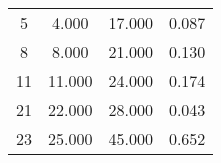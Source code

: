 % 
\begin{tabular}{cccc}
  \hline
  \hline
5 & 4.000 & 17.000 & 0.087 \\ 
  8 & 8.000 & 21.000 & 0.130 \\ 
  11 & 11.000 & 24.000 & 0.174 \\ 
  21 & 22.000 & 28.000 & 0.043 \\ 
  23 & 25.000 & 45.000 & 0.652 \\ 
   \hline
\end{tabular}
